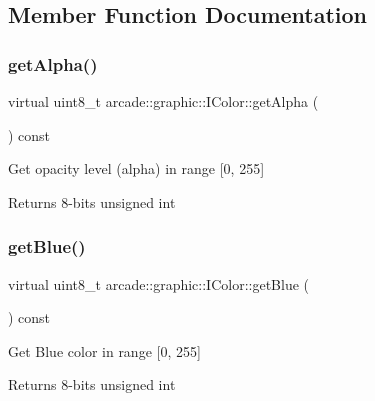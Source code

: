 \subsection{Member Function Documentation}
\mbox{\label{classarcade_1_1graphic_1_1_i_color_a44bd9427c1d58cbd49d64de03ffe86f2}} 
\subsubsection{\texorpdfstring{getAlpha()}{getAlpha()}}
{\footnotesize\ttfamily virtual uint8\+\_\+t arcade\+::graphic\+::\+I\+Color\+::get\+Alpha (\begin{DoxyParamCaption}{ }\end{DoxyParamCaption}) const\hspace{0.3cm}{\ttfamily [pure virtual]}}

Get opacity level (alpha) in range \mbox{[}0, 255\mbox{]} \begin{DoxyReturn}{Returns}
8-\/bits unsigned int 
\end{DoxyReturn}
\mbox{\label{classarcade_1_1graphic_1_1_i_color_a4d2755d998f9df75f9080f28e98b639b}} 
\subsubsection{\texorpdfstring{getBlue()}{getBlue()}}
{\footnotesize\ttfamily virtual uint8\+\_\+t arcade\+::graphic\+::\+I\+Color\+::get\+Blue (\begin{DoxyParamCaption}{ }\end{DoxyParamCaption}) const\hspace{0.3cm}{\ttfamily [pure virtual]}}

Get Blue color in range \mbox{[}0, 255\mbox{]} \begin{DoxyReturn}{Returns}
8-\/bits unsigned int 
\end{DoxyReturn}
\mbox{\label{classarcade_1_1graphic_1_1_i_color_af0e1bcabdae131d45e416cc8de726d98}} 
